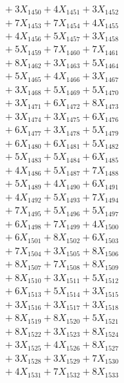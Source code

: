 \documentclass[a4paper,10pt]{article}
\begin{document}
{\begin{align}
&\;  + 3 X_{1450} + 4 X_{1451} + 3 X_{1452} \\[0.3ex]
&\;  + 7 X_{1453} + 7 X_{1454} + 4 X_{1455} \\[0.3ex]
&\;  + 4 X_{1456} + 5 X_{1457} + 3 X_{1458} \\[0.3ex]
&\;  + 5 X_{1459} + 7 X_{1460} + 7 X_{1461} \\[0.3ex]
&\;  + 8 X_{1462} + 3 X_{1463} + 5 X_{1464} \\[0.3ex]
&\;  + 5 X_{1465} + 4 X_{1466} + 3 X_{1467} \\[0.3ex]
&\;  + 3 X_{1468} + 5 X_{1469} + 5 X_{1470} \\[0.3ex]
&\;  + 3 X_{1471} + 6 X_{1472} + 8 X_{1473} \\[0.3ex]
&\;  + 3 X_{1474} + 3 X_{1475} + 6 X_{1476} \\[0.3ex]
&\;  + 6 X_{1477} + 3 X_{1478} + 5 X_{1479} \\[0.5ex]\allowbreak
&\;  + 6 X_{1480} + 6 X_{1481} + 5 X_{1482} \\[0.3ex]
&\;  + 5 X_{1483} + 5 X_{1484} + 6 X_{1485} \\[0.3ex]
&\;  + 4 X_{1486} + 5 X_{1487} + 7 X_{1488} \\[0.3ex]
&\;  + 5 X_{1489} + 4 X_{1490} + 6 X_{1491} \\[0.3ex]
&\;  + 4 X_{1492} + 5 X_{1493} + 7 X_{1494} \\[0.3ex]
&\;  + 7 X_{1495} + 5 X_{1496} + 5 X_{1497} \\[0.3ex]
&\;  + 6 X_{1498} + 7 X_{1499} + 4 X_{1500} \\[0.3ex]
&\;  + 6 X_{1501} + 8 X_{1502} + 6 X_{1503} \\[0.3ex]
&\;  + 7 X_{1504} + 3 X_{1505} + 8 X_{1506} \\[0.3ex]
&\;  + 8 X_{1507} + 7 X_{1508} + 8 X_{1509} \\[0.5ex]\allowbreak
&\;  + 8 X_{1510} + 3 X_{1511} + 5 X_{1512} \\[0.3ex]
&\;  + 6 X_{1513} + 5 X_{1514} + 3 X_{1515} \\[0.3ex]
&\;  + 3 X_{1516} + 3 X_{1517} + 3 X_{1518} \\[0.3ex]
&\;  + 8 X_{1519} + 8 X_{1520} + 5 X_{1521} \\[0.3ex]
&\;  + 8 X_{1522} + 3 X_{1523} + 8 X_{1524} \\[0.3ex]
&\;  + 3 X_{1525} + 4 X_{1526} + 8 X_{1527} \\[0.3ex]
&\;  + 3 X_{1528} + 3 X_{1529} + 7 X_{1530} \\[0.3ex]
&\;  + 4 X_{1531} + 7 X_{1532} + 8 X_{1533} \\[0.3ex]

\end{align}}
\end{document}
